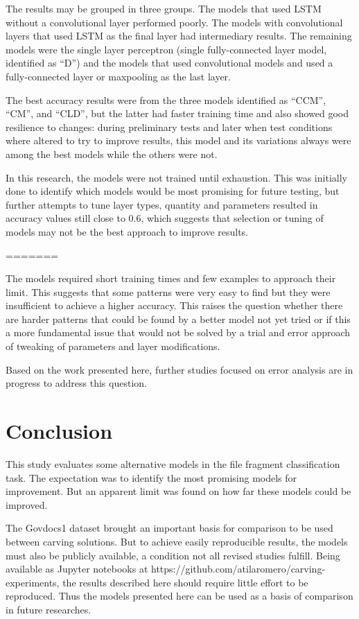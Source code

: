 The results may be grouped in three groups. The models that used LSTM without a convolutional layer performed poorly. The models with convolutional layers that used LSTM as the final layer had intermediary results. The remaining models were the single layer perceptron (single fully-connected layer model, identified as ``D'') and the models that used convolutional models and used a fully-connected layer or maxpooling as the last layer.

The best accuracy results were from the three models identified as ``CCM'', ``CM'', and ``CLD'', but the latter had faster training time and also showed good resilience to changes: during preliminary tests and later when test conditions where altered to try to improve results, this model and its variations always were among the best models while the others were not.

In this research, the models were not trained until exhaustion. This was initially done to identify which models would be most promising for future testing, but further attempts to tune layer types, quantity and parameters resulted in accuracy values still close to 0.6, which suggests that selection or tuning of models may not be the best approach to improve results.

=======


The models required short training times and few examples to approach their limit.
This suggests that some patterns were very easy to find but they were insufficient to achieve a higher accuracy.
This raises the question whether there are harder patterns that could be found by a better model not yet tried or if this a more fundamental issue that would not be solved by a trial and error approach of tweaking of parameters and layer modifications.

Based on the work presented here, further studies focused on error analysis are in progress to address this question.

\section{Conclusion}
This study evaluates some alternative models in the file fragment classification task. The expectation was to identify the most promising models for improvement. But an apparent limit was found on how far these models could be improved.

The Govdocs1 dataset brought an important basis for comparison to be used between carving solutions. But to achieve easily reproducible results, the models must also be publicly available, a condition not all revised studies fulfill. Being available as Jupyter notebooks at https://github.com/atilaromero/carving-experiments, the results described here should require little effort to be reproduced. Thus the models presented here can be used as a basis of comparison in  future researches.



